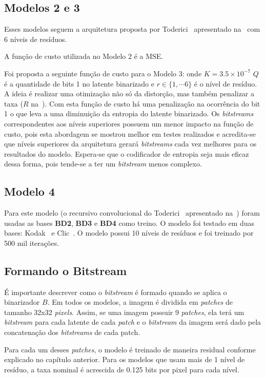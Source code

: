 \subsection{Modelos 2 e 3}
Esses modelos seguem a arquitetura proposta por Toderici~\cite{toderici2016} apresentado na~ com 6 níveis de resíduos. 

A função de custo utilizada no Modelo 2 é a \acrshort{MSE}. 

Foi proposta a seguinte função de custo para o Modelo 3:  onde $K = 3.5 \times 10^{-7}$ $Q$ é a quantidade de bits 1 no latente binarizado e $r \in \{1, \cdots 6\}$ é o nível de resíduo. A ideia é realizar uma otimização não só da distorção, mas também penalizar a taxa ($R$ na~). Com esta função de custo há uma penalização na ocorrência do bit 1 o que leva a uma diminuição da entropia do latente binarizado. Os \textit{bitstreams} correspondentes aos níveis superiores possuem um menor impacto na função de custo, pois esta abordagem se mostrou melhor em testes realizados e acredita-se que níveis superiores da arquitetura gerará \textit{bitstreams} cada vez melhores para os resultados do modelo. Espera-se que o codificador de entropia seja mais eficaz dessa forma, pois tende-se a ter um \textit{bitstream} menos complexo.
\subsection{Modelo 4}
Para este modelo (o recursivo convolucional do Toderici~\cite{toderici2016} apresentado na~) foram usadas as bases \textbf{BD2}, \textbf{BD3} e \textbf{BD4} como treino. O modelo foi testado em duas bases: Kodak~\cite{kodak} e Clic~\cite{clic}. O modelo possui 10 níveis de resíduos e foi treinado por 500 mil iterações.
\subsection{Formando o Bitstream}
É importante descrever como o \textit{bitstream} é formado quando se aplica o binarizador $B$. Em todos os modelos, a imagem é dividida em \textit{patches} de tamanho 32x32 \textit{pixels}. Assim, se uma imagem possuir 9 \textit{patches}, ela terá um \textit{bitstream} para cada latente de cada \textit{patch} e o \textit{bitstream} da imagem será dado pela concatenação dos \textit{bitstreams} de cada patch. 

Para cada um desses \textit{patches}, o modelo é treinado de maneira residual conforme explicado no capítulo anterior. Para os modelos que usam mais de 1 nível de resíduo, a taxa nominal é acrescida de 0.125 bits por pixel para cada nível. 

